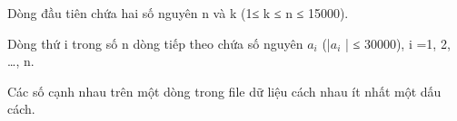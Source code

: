 Dòng đầu tiên chứa hai số nguyên n và k (1≤ k ≤ n ≤ 15000).

Dòng thứ i trong số n dòng tiếp theo chứa số nguyên $a_{i}$ (|$a_{i}$ | ≤ 30000), i =1, 2, …, n.

Các số cạnh nhau trên một dòng trong file dữ liệu cách nhau ít nhất một dấu cách.